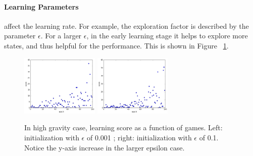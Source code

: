 \documentclass[11pt]{article}
\begin{document}
\paragraph{Learning Parameters} affect the learning rate. For example, the exploration factor is described by the parameter $\epsilon$. For a larger $\epsilon$, in the early learning stage it helps to explore more states, and thus helpful for the performance. This is shown in Figure ~\ref{Qepsilon}.
\begin{figure}[] 
\centering
        \includegraphics[width=0.33\textwidth]{Plot/learn_vel5_mtop25.png}
        \includegraphics[width=0.33\textwidth]{Plot/learn_epsilon01.png}
        \caption{In high gravity case, learning score as a function of games. Left: initialization with $\epsilon$ of 0.001 ; right: initialization with $\epsilon$ of 0.1. Notice the y-axis increase in the larger epsilon case.}
            \label{Qepsilon}
\end{figure}


\end{document}
